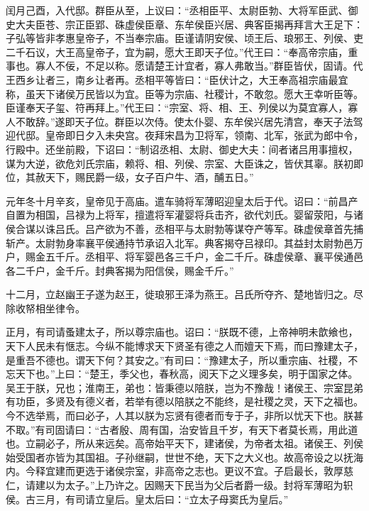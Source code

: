 \documentclass[12pt,UTF8]{ctexbook}
\begin{document}
闰月己酉，入代邸。群臣从至，上议曰：“丞相臣平、太尉臣勃、大将军臣武、御史大夫臣苍、宗正臣郢、硃虚侯臣章、东牟侯臣兴居、典客臣揭再拜言大王足下：子弘等皆非孝惠皇帝子，不当奉宗庙。臣谨请阴安侯、顷王后、琅邪王、列侯、吏二千石议，大王高皇帝子，宜为嗣，愿大王即天子位。”代王曰：“奉高帝宗庙，重事也。寡人不佞，不足以称。愿请楚王计宜者，寡人弗敢当。”群臣皆伏，固请。代王西乡让者三，南乡让者再。丞相平等皆曰：“臣伏计之，大王奉高祖宗庙最宜称，虽天下诸侯万民皆以为宜。臣等为宗庙、社稷计，不敢忽。愿大王幸听臣等。臣谨奉天子玺、符再拜上。”代王曰：“宗室、将、相、王、列侯以为莫宜寡人，寡人不敢辞。”遂即天子位。群臣以次侍。使太仆婴、东牟侯兴居先清宫，奉天子法驾迎代邸。皇帝即日夕入未央宫。夜拜宋昌为卫将军，领南、北军，张武为郎中令，行殿中。还坐前殿，下诏曰：“制诏丞相、太尉、御史大夫：间者诸吕用事擅权，谋为大逆，欲危刘氏宗庙，赖将、相、列侯、宗室、大臣诛之，皆伏其辜。朕初即位，其赦天下，赐民爵一级，女子百户牛、酒，酺五日。”



元年冬十月辛亥，皇帝见于高庙。遣车骑将军薄昭迎皇太后于代。诏曰：“前昌产自置为相国，吕禄为上将军，擅遣将军灌婴将兵击齐，欲代刘氏。婴留荥阳，与诸侯合谋以诛吕氏。吕产欲为不善，丞相平与太尉勃等谋夺产等军。硃虚侯章首先捕斩产。太尉勃身率襄平侯通持节承诏入北军。典客揭夺吕禄印。其益封太尉勃邑万户，赐金五千斤。丞相平、将军婴邑各三千户，金二千斤。硃虚侯章、襄平侯通邑各二千户，金千斤。封典客揭为阳信侯，赐金千斤。”



十二月，立赵幽王子遂为赵王，徙琅邪王泽为燕王。吕氏所夺齐、楚地皆归之。尽除收帑相坐律令。



正月，有司请蚤建太子，所以尊宗庙也。诏曰：“朕既不德，上帝神明未歆飨也，天下人民未有惬志。今纵不能博求天下贤圣有德之人而嬗天下焉，而曰豫建太子，是重吾不德也。谓天下何？其安之。”有司曰：“豫建太子，所以重宗庙、社稷，不忘天下也。”上曰：“楚王，季父也，春秋高，阅天下之义理多矣，明于国家之体。吴王于朕，兄也；淮南王，弟也：皆秉德以陪朕，岂为不豫哉！诸侯王、宗室昆弟有功臣，多贤及有德义者，若举有德以陪朕之不能终，是社稷之灵，天下之福也。今不选举焉，而曰必子，人其以朕为忘贤有德者而专于子，非所以忧天下也。朕甚不取。”有司固请曰：“古者殷、周有国，治安皆且千岁，有天下者莫长焉，用此道也。立嗣必子，所从来远矣。高帝始平天下，建诸侯，为帝者太祖。诸侯王、列侯始受国者亦皆为其国祖。子孙继嗣，世世不绝，天下之大义也。故高帝设之以抚海内。今释宜建而更选于诸侯宗室，非高帝之志也。更议不宜。子启最长，敦厚慈仁，请建以为太子。”上乃许之。因赐天下民当为父后者爵一级。封将军薄昭为轵侯。古三月，有司请立皇后。皇太后曰：“立太子母窦氏为皇后。”
\end{document}
